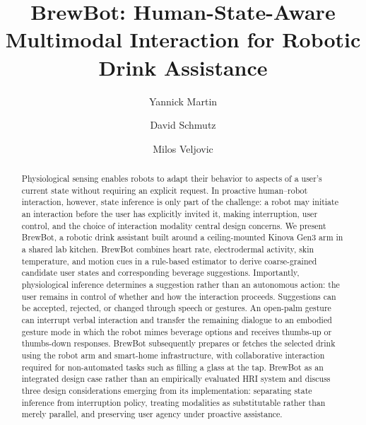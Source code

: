 \documentclass[sigconf, nonacm, screen=True, review=False, anonymous=False, authordraft=False]{acmart}
\begin{document}
\title[BrewBot]{BrewBot: Human-State-Aware Multimodal Interaction for Robotic Drink Assistance}

\author{Yannick Martin}

\author{David Schmutz}

\author{Milos Veljovic}

\begin{abstract}
Physiological sensing enables robots to adapt their behavior to aspects of a
user's current state without requiring an explicit request. In proactive
human--robot interaction, however, state inference is only part of the challenge:
a robot may initiate an interaction before the user has explicitly invited it, 
making interruption, user control, and the choice of interaction modality central
design concerns. We present BrewBot, a robotic drink assistant built around a
ceiling-mounted Kinova Gen3 arm in a shared lab kitchen. BrewBot combines heart
rate, electrodermal activity, skin temperature, and motion cues in a rule-based
estimator to derive coarse-grained candidate user states and corresponding
beverage suggestions. Importantly, physiological inference determines a
suggestion rather than an autonomous action: the user remains in control of
whether and how the interaction proceeds. Suggestions can be accepted, rejected,
or changed through speech or gestures. An open-palm gesture can interrupt verbal
interaction and transfer the remaining dialogue to an embodied gesture mode in
which the robot mimes beverage options and receives thumbs-up or thumbs-down
responses. BrewBot subsequently prepares or fetches the selected drink using the
robot arm and smart-home infrastructure, with collaborative interaction required
for non-automated tasks such as filling a glass at the tap. BrewBot as an
integrated design case rather than an empirically evaluated HRI system and
discuss three design considerations emerging from its implementation:
separating state inference from interruption policy, treating modalities as
substitutable rather than merely parallel, and preserving user agency under
proactive assistance.
\end{abstract}
\end{document}
